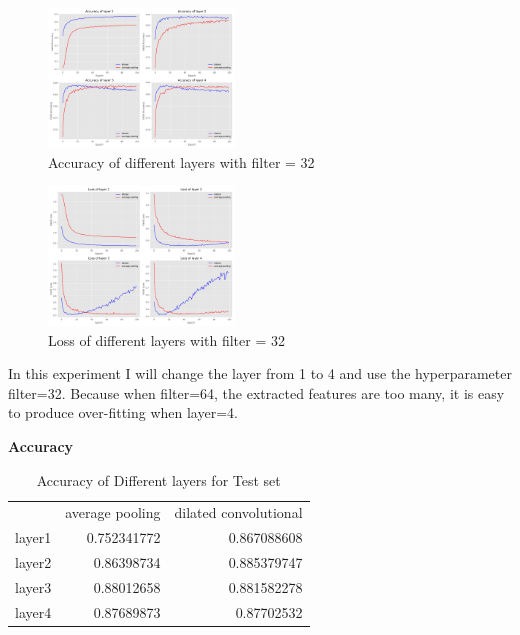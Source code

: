 \documentclass{article}
\begin{document}
\begin{figure}[H] %
	\centering %
	\includegraphics[width=0.44\textwidth]{./pic/part2/dilated_average_layer_acc.pdf} %
	\caption{Accuracy of different layers with filter = 32} %
	\label{Fig.main2} %
\end{figure}

\begin{figure}[H] %
	\centering %
	\includegraphics[width=0.44\textwidth]{./pic/part2/dilated_average_layer_loss.pdf} %
	\caption{Loss of different layers with filter = 32} %
	\label{Fig.main2} %
\end{figure}

In this experiment I will change the layer from 1 to 4 and use the hyperparameter filter=32. Because when filter=64, the extracted features are too many, it is easy to produce over-fitting when layer=4.

\textbf{Accuracy}

\begin{table}[H]
  \centering
  \caption{Accuracy of Different layers for Test set}
    \begin{tabular}{lrr}
          & \multicolumn{1}{l}{average pooling} & \multicolumn{1}{l}{dilated convolutional} \\
    layer1 & 0.752341772 & 0.867088608 \\
    layer2 & 0.86398734 & 0.885379747 \\
    layer3 & 0.88012658 & 0.881582278 \\
    layer4 & 0.87689873 & 0.87702532 \\
    \end{tabular}%
  \label{tab:addlabel}%
\end{table}%
\end{document}

